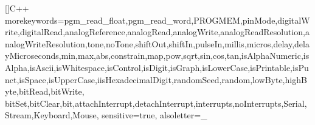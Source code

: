 \newcommand{\important}[1]{\ignorespaces\textcolor{uamai}{#1}}


\newcommand{\slideheader}[1]{

  \IfEqCase{#1}{
    {EN}{
    \addtobeamertemplate{frametitle}{}{%
    \begin{tikzpicture}[remember picture,overlay]
        \node[anchor=north east,yshift=7.9mm,xshift=4.5mm] at (current page.north east) {\texttt{[image: uamai]}};
    \end{tikzpicture}}
    }
    {SK}{
    \addtobeamertemplate{frametitle}{}{%
    \begin{tikzpicture}[remember picture,overlay]
        \node[anchor=north east,yshift=7.9mm,xshift=4.5mm] at (current page.north east) {\texttt{[image: uamaiSK]}};
    \end{tikzpicture}}
    }
  }
}

\makeatletter
{}
\makeatother


 \usepackage{graphicx}
\graphicspath{{./figs/}}
\usepackage{epstopdf} %
\newcommand{\figone}[0] {1.000\textwidth} %
\newcommand{\figtwo}[0] {0.48\textwidth} %
\newcommand{\figthree}[0] {0.321\textwidth} %
\newcommand{\figtwoh}[0] {0.3\textheight} %


\usepackage{subfigure}
\usepackage{amsfonts}
\usepackage{amssymb}
\usepackage{amsmath}
\usepackage{theorem}
\usepackage{epsfig}
\usepackage{mathrsfs} %
\usepackage[utf8]{inputenc}
\usepackage[T1]{fontenc}
\usepackage{courier} %
\usepackage{listings}
\lstset{basicstyle=\normalsize\ttfamily,breaklines=true,numbers=left,xleftmargin=2em,frame=single,framexleftmargin=1.5em}

[]{C++}      %
{morekeywords={pgm_read_float,pgm_read_word,PROGMEM,pinMode,digitalWrite,digitalRead,analogReference,analogRead,analogWrite,analogReadResolution,analogWriteResolution,tone,noTone,shiftOut,shiftIn,pulseIn,millis,micros,delay,delayMicroseconds,min,max,abs,constrain,map,pow,sqrt,sin,cos,tan,isAlphaNumeric,isAlpha,isAscii,isWhitespace,isControl,isDigit,isGraph,isLowerCase,isPrintable,isPunct,isSpace,isUpperCase,iisHexadecimalDigit,randomSeed,random,lowByte,highByte,bitRead,bitWrite,
bitSet,bitClear,bit,attachInterrupt,detachInterrupt,interrupts,noInterrupts,Serial,Stream,Keyboard,Mouse},
sensitive=true,
alsoletter={_}
}



